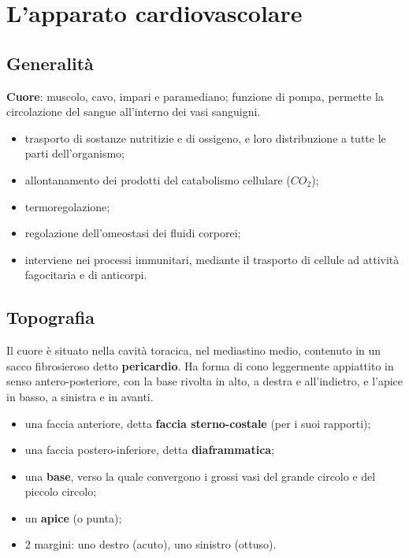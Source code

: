 \chapter{L'apparato cardiovascolare}

\section{Generalità}

\textbf{Cuore}: muscolo, cavo, impari e paramediano; funzione di pompa, permette la circolazione
del sangue all'interno dei vasi sanguigni.

\begin{itemize}
  \item trasporto di sostanze nutritizie e di ossigeno, e loro distribuzione a tutte le parti
    dell'organismo;
  \item allontanamento dei prodotti del catabolismo cellulare ($CO_2$);
  \item termoregolazione;
  \item regolazione dell'omeostasi dei fluidi corporei;
  \item interviene nei processi immunitari, mediante il trasporto di cellule ad attività
    fagocitaria e di anticorpi.
\end{itemize}

\section{Topografia}

Il cuore è situato nella cavità toracica, nel mediastino medio, contenuto in un sacco
fibrosieroso detto \textbf{pericardio}. Ha forma di cono leggermente appiattito in senso
antero-posteriore, con la base rivolta in alto, a destra e all'indietro, e l'apice in basso, a
sinistra e in avanti.

\begin{itemize}
  \item una faccia anteriore, detta \textbf{faccia sterno-costale} (per i suoi rapporti);
  \item una faccia postero-inferiore, detta \textbf{diaframmatica};
  \item una \textbf{base}, verso la quale convergono i grossi vasi del grande circolo e del
    piccolo circolo;
  \item un \textbf{apice} (o punta);
  \item 2 margini: uno destro (acuto), uno sinistro (ottuso).
\end{itemize}

